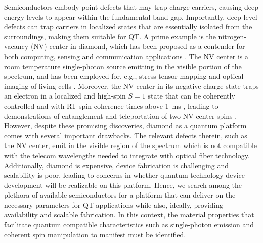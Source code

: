 \documentclass[superscriptaddress,unsortedaddress,
 amsmath,amssymb,
 aps,
]{revtex4-2}
\begin{document}
Semiconductors embody point defects that may trap charge carriers, causing deep energy levels to appear within the fundamental band gap. 
Importantly, deep level defects can trap carriers in localized states that are essentially isolated from the surroundings, making them suitable for QT. 
A prime example is the nitrogen-vacancy (NV) center in diamond, which has been proposed 
as a contender for both computing, sensing and communication applications \cite{Doherty_2013}. 
The NV center is a room temperature single-photon source emitting in the visible portion of the spectrum, and has been employed for, e.g., stress tensor mapping \cite{Broadway2019} and optical imaging of living cells \cite{Lesage_2013}.  
Moreover, the NV center in its negative charge state traps an electron in a localized and high-spin $S=1$ state that can be coherently controlled and with RT spin coherence times above \SI{1}{\milli\second} \cite{Doherty_2013}, 
leading to demonstrations of entanglement and teleportation of two NV center spins \cite{Bernien2013,Pfaff_2014}. 
However, despite these promising discoveries, diamond  as a quantum platform comes with several important drawbacks. The relevant defects therein, such as the NV center, emit in the visible region of the spectrum which is not compatible with the telecom wavelengths needed to integrate with optical fiber technology. 
Additionally, diamond is expensive, device fabrication is challenging and scalability is poor, leading to concerns in whether quantum technology device development will be realizable on this platform. 
Hence, we search among the plethora of available semiconductors for a platform that can deliver on the necessary parameters for QT applications while also, ideally, providing availability and scalable fabrication. 
In this context, the material properties that facilitate quantum compatible characteristics such as single-photon emission and coherent spin manipulation to manifest must be identified. 
\end{document}
